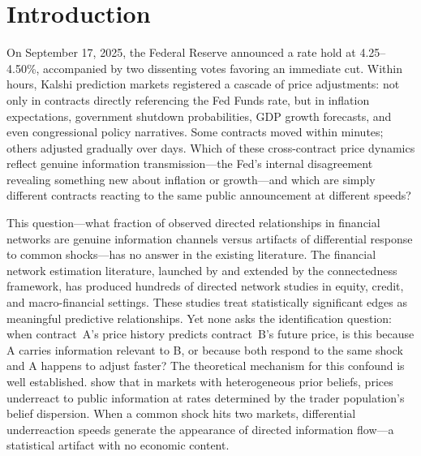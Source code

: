 \documentclass[12pt,letterpaper]{article}
\begin{document}
\newpage
\setcounter{page}{1}


\section{Introduction}

On September 17, 2025, the Federal Reserve announced a rate hold at 4.25--4.50\%, accompanied by two dissenting votes favoring an immediate cut. Within hours, Kalshi prediction markets registered a cascade of price adjustments: not only in contracts directly referencing the Fed Funds rate, but in inflation expectations, government shutdown probabilities, GDP growth forecasts, and even congressional policy narratives. Some contracts moved within minutes; others adjusted gradually over days. Which of these cross-contract price dynamics reflect genuine information transmission---the Fed's internal disagreement revealing something new about inflation or growth---and which are simply different contracts reacting to the same public announcement at different speeds?

This question---what fraction of observed directed relationships in financial networks are genuine information channels versus artifacts of differential response to common shocks---has no answer in the existing literature. The financial network estimation literature, launched by \citet{billio2012econometric} and extended by the \citet{diebold2014network} connectedness framework, has produced hundreds of directed network studies in equity, credit, and macro-financial settings. These studies treat statistically significant edges as meaningful predictive relationships. Yet none asks the identification question: when contract~A's price history predicts contract~B's future price, is this because A carries information relevant to B, or because both respond to the same shock and A happens to adjust faster? The theoretical mechanism for this confound is well established. \citet{ottaviani2015price} show that in markets with heterogeneous prior beliefs, prices underreact to public information at rates determined by the trader population's belief dispersion. When a common shock hits two markets, differential underreaction speeds generate the appearance of directed information flow---a statistical artifact with no economic content.
\end{document}
